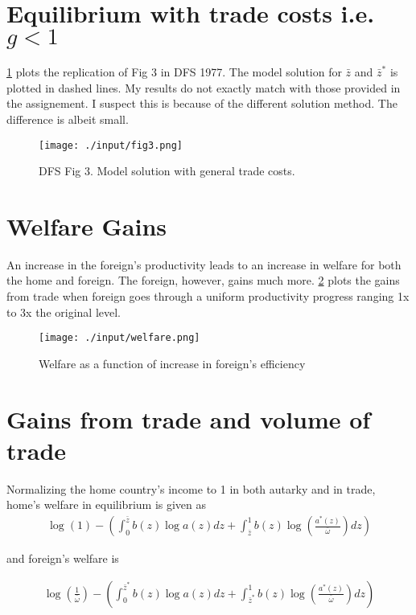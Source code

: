 \documentclass{report}
\numberwithin{equation}{section}
\numberwithin{figure}{section}
\numberwithin{table}{section}
\begin{document}
\section{Equilibrium with trade costs i.e. $g < 1$}

\ref{fig3} plots the replication of Fig 3 in DFS 1977. The model solution for $\bar z$ and $\bar z^*$ is plotted in dashed lines. My results do not exactly match with those provided in the assignement. I suspect this is because of the different solution method. The difference is albeit small.
\begin{figure}[H]
  \centering
  \texttt{[image: ./input/fig3.png]}
  \caption{DFS Fig 3. Model solution with general trade costs.}
  \label{fig3}
\end{figure}

\section{Welfare Gains}

An increase in the foreign's productivity leads to an increase in welfare for both the home and foreign. The foreign, however, gains much more. \ref{welfare} plots the gains from trade when foreign goes through a uniform productivity progress ranging 1x to 3x the original level.
\begin{figure}[H]
  \centering
  \texttt{[image: ./input/welfare.png]}
  \caption{Welfare as a function of increase in foreign's efficiency}
  \label{welfare}
\end{figure}

\section{Gains from trade and volume of trade}

Normalizing the home country's income to 1 in both autarky and in trade, home's welfare in equilibrium is given as
\begin{align}
  \log(1) - \left( \int_0^{\bar z} b(z) \log a(z) dz + \int_{\bar z}^1 b(z) \log(\frac{a^*(z)}{\bar \omega}) dz \right)
\end{align}


and foreign's welfare is

\begin{align}
  \log(\frac{1}{\bar \omega}) - \left( \int_0^{\bar z^*} b(z) \log a(z) dz + \int_{\bar z^*}^1 b(z) \log(\frac{a^*(z)}{\bar \omega}) dz \right)
\end{align}
\end{document}

